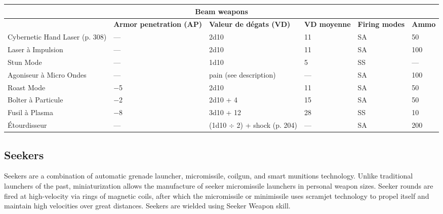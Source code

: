 \begin{table} \begin{tabularx}{\textwidth}{|X|X|X|X|l|l|} \hline

\multicolumn{6}{|c|}{\textbf{Beam weapons}} \\ \hline

&\textbf{Armor penetration (AP)}	&\textbf{Valeur de dégats (VD)}	&\textbf{VD moyenne}	&\textbf{Firing modes}	&\textbf{Ammo} \\ \hline

Cybernetic Hand Laser (p. 308)	&--- &2d10	&11	&SA	&50 \\ \hline

Laser à Impulsion	&--- &2d10	&11	&SA	&100 \\ \hline

Stun Mode	&--- &1d10	&5	&SS	&--- \\ \hline

Agoniseur à Micro Ondes	&--- &pain (see description)	&--- &SA	&100 \\ \hline

Roast Mode	&$-$5	&2d10	&11	&SA	&50 \\ \hline

Bolter à Particule	&$-$2	&2d10 + 4	&15	&SA	&50 \\ \hline

Fusil à Plasma	&$-$8	&3d10 + 12	&28	&SS	&10 \\ \hline

Étourdisseur	&--- &(1d10 $\div$ 2) + shock (p. 204)	&--- &SA	&200 \\ \hline

\end{tabularx} \label{tab:beam-weapons} \end{table} 



\subsection{Seekers} \label{sec:seekers} 

Seekers are a combination of automatic grenade launcher, micromissile, coilgun, and smart munitions technology. Unlike traditional launchers of the past, miniaturization allows the manufacture of seeker micromissile launchers in personal weapon sizes. Seeker rounds are fired at high-velocity via rings of magnetic coils, after which the micromissile or minimissile uses scramjet technology to propel itself and maintain high velocities over great distances. Seekers are wielded using Seeker Weapon skill. 


